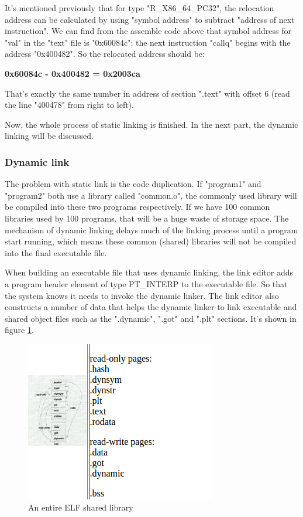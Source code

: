      It's mentioned previously that for type "R\_X86\_64\_PC32", the relocation address can be calculated by using "symbol address" to subtract "address of next instruction". We can find from the assemble code above that symbol address for "val" in the "text" file is "0x60084c"; the next instruction "callq" begins with the address "0x400482". So the relocated address should be:    
     
     \textbf{0x60084c - 0x400482 = 0x2003ca}
     
     That's exactly the same number in address of section ".text" with offset 6 (read the line "400478" from right to left).
     
     
     Now, the whole process of static linking is finished. In the next part, the dynamic linking will be discussed.  
     
        
    \subsubsection{Dynamic link}
    The problem with static link is the code duplication. If "program1" and "program2" both use a library called "common.o", the commonly used library will be compiled into these two programs respectively. If we have 100 common libraries used by 100 programs, that will be a huge waste of storage space. The mechanism of dynamic linking delays much of the linking process until a program start running\cite{LAL-00}, which means these common (shared) libraries will not be compiled into the final executable file. 
    
    When building an executable file that uses dynamic linking, the link editor adds a program header element of type PT\_INTERP to the executable file\cite{TIS-95}. So that the system knows it needs to invoke the dynamic linker\cite{TIS-95}. The link editor also constructs a number of data that helps the dynamic linker to link executable and shared object files\cite{TIS-95} such as the ".dynamic", ".got" and ".plt" sections. It's shown in figure \ref{fig:ELFsharedlibrary}.
    
            \begin{figure}
                \centering
                \includegraphics[scale = 0.6]
                {Images/concepts/ELFsharedlibrary.png}
                \caption[An entire ELF shared library]%
                {An entire ELF shared library\footnotemark}    
                \label{fig:ELFsharedlibrary}
            \end{figure}
            
